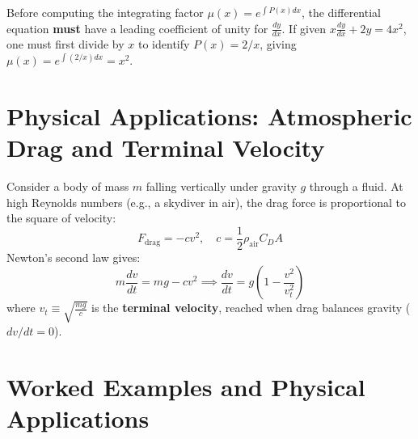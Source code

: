 \begin{pitfallbox}
Before computing the integrating factor $\mu(x) = e^{\int P(x)dx}$, the differential equation \textbf{must} have a leading coefficient of unity for $\frac{dy}{dx}$. If given $x\frac{dy}{dx} + 2y = 4x^2$, one must first divide by $x$ to identify $P(x) = 2/x$, giving $\mu(x) = e^{\int (2/x)dx} = x^2$.
\end{pitfallbox}

\section{Physical Applications: Atmospheric Drag and Terminal Velocity}
Consider a body of mass $m$ falling vertically under gravity $g$ through a fluid. At high Reynolds numbers (e.g., a skydiver in air), the drag force is proportional to the square of velocity:
\begin{equation}
F_{\text{drag}} = -c v^2, \quad c = \frac{1}{2}\rho_{\text{air}} C_D A
\end{equation}
Newton's second law gives:
\begin{equation}
m\frac{dv}{dt} = mg - cv^2 \implies \frac{dv}{dt} = g\left(1 - \frac{v^2}{v_t^2}\right)
\end{equation}
where $v_t \equiv \sqrt{\frac{mg}{c}}$ is the \textbf{terminal velocity}, reached when drag balances gravity ($dv/dt = 0$).

\section{Worked Examples and Physical Applications}

